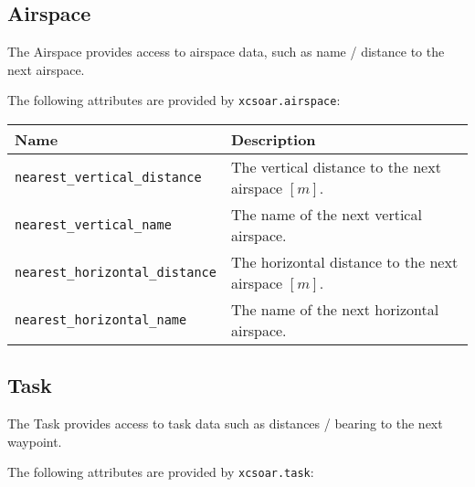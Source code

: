 \subsection{Airspace}

The Airspace provides access to airspace data, such as name / distance
to the next airspace.

The following attributes are provided by \verb|xcsoar.airspace|:

\begin{maxipage}
\begin{tabularx}{1.9\textwidth}{l|X}
Name & Description \\
\hline\hline

\verb|nearest_vertical_distance| & The vertical distance to the next airspace
$[{m}]$.\\

\hline

\verb|nearest_vertical_name| & The name of the next vertical airspace. \\

\hline

\verb|nearest_horizontal_distance| & The horizontal distance to the next airspace 
$[{m}]$. \\

\hline

\verb|nearest_horizontal_name| & The name of the next horizontal airspace. \\

\end{tabularx}
\end{maxipage}

\subsection{Task}

The Task provides access to task data such as distances / bearing to the 
next waypoint.

The following attributes are provided by \verb|xcsoar.task|:

